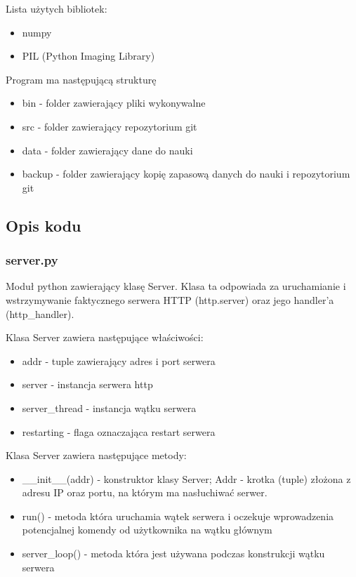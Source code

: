 \documentclass{article}
\begin{document}
Lista użytych bibliotek:
\begin{itemize}
    \item numpy
    \item PIL (Python Imaging Library)
\end{itemize}



Program ma następującą strukturę
\begin{itemize}
    \item bin - folder zawierający pliki wykonywalne
    \item src - folder zawierający repozytorium git
    \item data - folder zawierający dane do nauki
    \item backup - folder zawierający kopię zapasową danych do nauki i repozytorium git
\end{itemize}

\subsection{Opis kodu}
\subsubsection{server.py}
Moduł python zawierający klasę Server. Klasa ta odpowiada za uruchamianie i wstrzymywanie faktycznego serwera HTTP (http.server) oraz jego handler'a (http\_handler).

Klasa Server zawiera następujące właściwości:
\begin{itemize}
    \item addr - tuple zawierający adres i port serwera
    \item server - instancja serwera http
    \item server\_thread - instancja wątku serwera
    \item restarting - flaga oznaczająca restart serwera
\end{itemize}

Klasa Server zawiera następujące metody:
\begin{itemize}
    \item \_\_init\_\_(addr) - konstruktor klasy Server; Addr - krotka (tuple) złożona z adresu IP oraz portu, na którym ma nasłuchiwać serwer.
    \item run() - metoda która uruchamia wątek serwera i oczekuje wprowadzenia potencjalnej komendy od użytkownika na wątku głównym
    \item server\_loop() - metoda która jest używana podczas konstrukcji wątku serwera 
\end{itemize}
\end{document}
